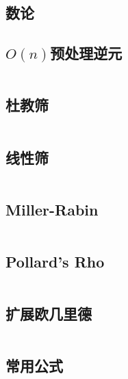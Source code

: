 \documentclass[a4paper]{article}
\begin{document}
\begin{multicols}{2}
		\section{数论}

			\subsection{$O(n)$预处理逆元}
				\inputminted{cpp}{../src/numbertheory/O(n)求逆元.cpp}

			\subsection{杜教筛}
				\inputminted{cpp}{../src/numbertheory/杜教筛.cpp}
			
			\subsection{线性筛}
				\inputminted{cpp}{../src/numbertheory/扩展线性筛.cpp}



			\subsection{Miller-Rabin}
				\inputminted{cpp}{../src/numbertheory/Miller-Rabin.cpp}

			\subsection{Pollard's Rho}
				\inputminted{cpp}{../src/numbertheory/Pollard-Rho.cpp}
			


			\subsection{扩展欧几里德}
				\inputminted[]{cpp}{../src/math/exgcd.cpp}
				
			
			\subsection{常用公式}
				
				


\end{multicols}
\end{document}
